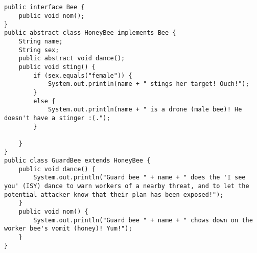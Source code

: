 \question
\begin{lstlisting}[aboveskip=-\baselineskip]


public interface Bee {
    public void nom();
}
public abstract class HoneyBee implements Bee {
    String name;
    String sex;
    public abstract void dance();
    public void sting() {
        if (sex.equals("female")) {
            System.out.println(name + " stings her target! Ouch!");
        }
        else {
            System.out.println(name + " is a drone (male bee)! He doesn't have a stinger :(.");
        }
        
    }
}
public class GuardBee extends HoneyBee {
    public void dance() {
        System.out.println("Guard bee " + name + " does the 'I see you' (ISY) dance to warn workers of a nearby threat, and to let the potential attacker know that their plan has been exposed!");
    }
    public void nom() {
        System.out.println("Guard bee " + name + " chows down on the worker bee's vomit (honey)! Yum!");
    }
}
\end{lstlisting}

